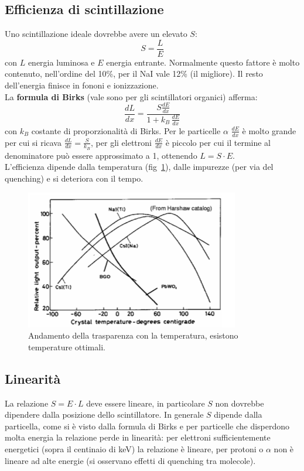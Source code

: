 \subsection{Efficienza di scintillazione}
Uno scintillazione ideale dovrebbe avere un elevato $S$:
\begin{equation*}
S = \frac{L}{E} 
\end{equation*}
con $L$ energia luminosa e $E$ energia entrante.
Normalmente questo fattore \`e molto contenuto, nell'ordine del 10\%, per il NaI vale 12\% (il migliore).
Il resto dell'energia finisce in fononi e ionizzazione.\\
La \textbf{formula di Birks} (vale sono per gli scintillatori organici) afferma:
\begin{equation*}
\frac{dL}{dx} = \frac{S \frac{dE}{dx}}{1 + k_B \, \frac{dE}{dx}}
\end{equation*}
con $k_B$ costante di proporzionalit\`a di Birks.
Per le particelle $\alpha$ $\frac{dE}{dx}$ \`e molto grande per cui si ricava $\frac{dL}{dx} = \frac{S}{k_B}$, per gli elettroni
$\frac{dE}{dx}$ \`e piccolo per cui il termine al denominatore pu\`o essere approssimato a 1, ottenendo $L = S \cdot E$.\\
L'efficienza dipende dalla temperatura (fig~\ref{fig:traspInorganici}), dalle impurezze (per via del quenching) e si deteriora con il tempo.
\begin{figure}[htbp]
\begin{center}
\includegraphics[scale=1]{./Immagini/TrasparenzaOrganici.png}
\caption{Andamento della trasparenza con la temperatura, esistono temperature ottimali.}
\label{fig:traspInorganici}
\end{center}
\end{figure}
\subsection{Linearit\`a}
La relazione $S = E \cdot L$ deve essere lineare, in particolare $S$ non dovrebbe dipendere dalla posizione dello scintillatore.
In generale $S$ dipende dalla particella, come si \`e visto dalla formula di Birks e per particelle che disperdono molta energia la relazione perde in linearit\`a:
per elettroni sufficientemente energetici (sopra il centinaio di keV) la relazione \`e lineare, per protoni o $\alpha$ non \`e lineare ad alte energie (si osservano
effetti di quenching tra molecole).
